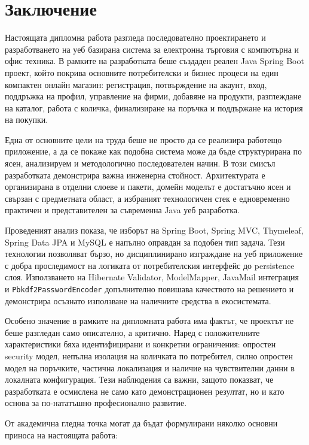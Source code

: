 \section{Заключение}

Настоящата дипломна работа разгледа последователно проектирането и разработването на уеб базирана система за електронна търговия с компютърна и офис техника. В рамките на разработката беше създаден реален Java Spring Boot проект, който покрива основните потребителски и бизнес процеси на един компактен онлайн магазин: регистрация, потвърждение на акаунт, вход, поддръжка на профил, управление на фирми, добавяне на продукти, разглеждане на каталог, работа с количка, финализиране на поръчка и поддържане на история на покупки.

Една от основните цели на труда беше не просто да се реализира работещо приложение, а да се покаже как подобна система може да бъде структурирана по ясен, анализируем и методологично последователен начин. В този смисъл разработката демонстрира важна инженерна стойност. Архитектурата е организирана в отделни слоеве и пакети, домейн моделът е достатъчно ясен и свързан с предметната област, а избраният технологичен стек е едновременно практичен и представителен за съвременна Java уеб разработка.

Проведеният анализ показа, че изборът на Spring Boot, Spring MVC, Thymeleaf, Spring Data JPA и MySQL е напълно оправдан за подобен тип задача. Тези технологии позволяват бързо, но дисциплинирано изграждане на уеб приложение с добра проследимост на логиката от потребителския интерфейс до persistence слоя. Използването на Hibernate Validator, ModelMapper, JavaMail интеграция и \texttt{Pbkdf2PasswordEncoder} допълнително повишава качеството на решението и демонстрира осъзнато използване на наличните средства в екосистемата.

Особено значение в рамките на дипломната работа има фактът, че проектът не беше разгледан само описателно, а критично. Наред с положителните характеристики бяха идентифицирани и конкретни ограничения: опростен security модел, непълна изолация на количката по потребител, силно опростен модел на поръчките, частична локализация и наличие на чувствителни данни в локалната конфигурация. Тези наблюдения са важни, защото показват, че разработката е осмислена не само като демонстрационен резултат, но и като основа за по-нататъшно професионално развитие.

От академична гледна точка могат да бъдат формулирани няколко основни приноса на настоящата работа:

